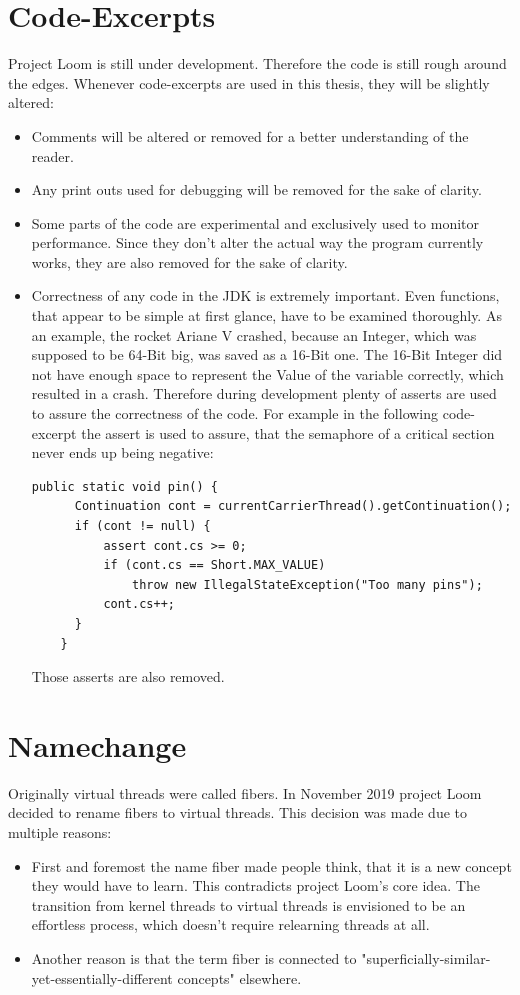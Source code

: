 \section{Code-Excerpts}
Project Loom is still under development. Therefore the code is still rough around the edges. Whenever code-excerpts are used in this thesis, they will be slightly altered:
\begin{itemize}
  \item Comments will be altered or removed for a better understanding of the reader.
  \item Any print outs used for debugging will be removed for the sake of clarity.
  \item Some parts of the code are experimental and exclusively used to monitor performance. Since they don't alter the actual way the program currently works, they are also removed for the sake of clarity.
  \item Correctness of any code in the JDK is extremely important. Even functions, that appear to be simple at first glance, have to be examined thoroughly. As an example, the rocket Ariane V crashed, because an Integer, which was supposed to be 64-Bit big, was saved as a 16-Bit one. The 16-Bit Integer did not have enough space to represent the Value of the variable correctly, which resulted in a crash.\cite{Ariane5} Therefore during development plenty of asserts are used to assure the correctness of the code. For example in the following code-excerpt the assert is used to assure, that the semaphore of a critical section never ends up being negative:

        \begin{lstlisting}[language=custom-java]
    public static void pin() {
      Continuation cont = currentCarrierThread().getContinuation();
      if (cont != null) {
          assert cont.cs >= 0;
          if (cont.cs == Short.MAX_VALUE)
              throw new IllegalStateException("Too many pins");
          cont.cs++;
      }
    }
    \end{lstlisting}

        Those asserts are also removed.
\end{itemize}

\section{Namechange}
Originally virtual threads were called fibers. In November 2019 project Loom decided to rename fibers to virtual threads. This decision was made due to multiple reasons:
\begin{itemize}
  \item First and foremost the name fiber made people think, that it is a new concept they would have to learn. This contradicts project Loom's core idea. The transition from kernel threads to virtual threads is envisioned to be an effortless process, which doesn't require relearning threads at all.
  \item Another reason is that the term fiber is connected to "superficially-similar-yet-essentially-different concepts"\cite{loom:namechange} elsewhere. 
\end{itemize}

